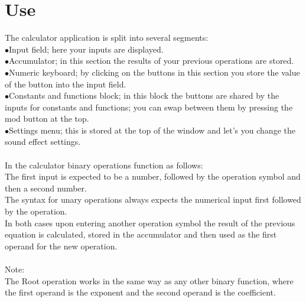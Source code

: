 \documentclass{article}
\begin{document}
\section{Use}
	The calculator application is split into several segments:\\
	$\bullet$Input field; here your inputs are displayed.\\
	$\bullet$Accumulator; in this section the results of your previous operations are stored.\\
	$\bullet$Numeric keyboard; by clicking on the buttons in this section you store the value of the button into the input field.\\
	$\bullet$Constants and functions block; in this block the buttons are shared by the inputs for constants and functions; you can swap between them by pressing the mod button at the top.\\
	$\bullet$Settings menu; this is stored at the top of the window and let's you change the sound effect settings.\\
	\\
	In the calculator binary operations function as follows:\\
	The first input is expected to be a number, followed by the operation symbol and then a second number.\\
	The syntax for unary operations always expects the numerical input first followed by the operation.\\
	In both cases upon entering another operation symbol the result of the previous equation is calculated, stored in the accumulator and then used as the first operand for the new operation.\\
	\\
	Note:\\
	The Root operation works in the same way as any other binary function, where the first operand is the exponent and the second operand is the coefficient. 
	
\end{document}
